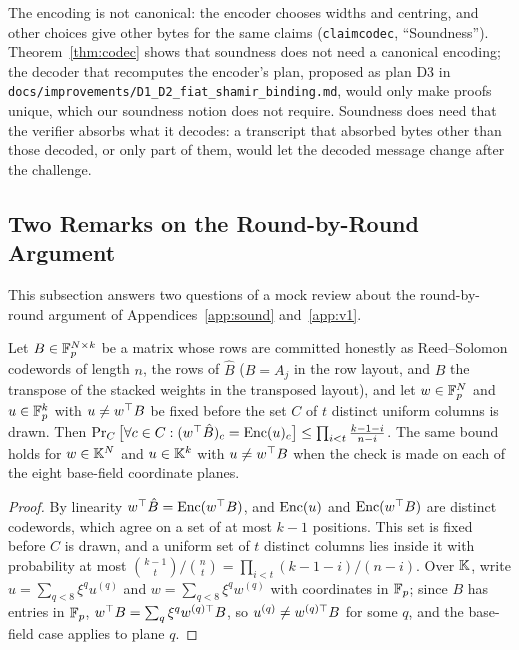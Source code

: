 \noindent The encoding is not canonical: the encoder chooses widths and centring, and other choices
give other bytes for the same claims (\texttt{claimcodec}, ``Soundness''). Theorem~\ref{thm:codec}
shows that soundness does not need a canonical encoding; the decoder that recomputes the encoder's
plan, proposed as plan D3 in \texttt{docs/improvements/D1\_D2\_fiat\_shamir\_binding.md}, would only
make proofs unique, which our soundness notion does not require. Soundness does need that the
verifier absorbs what it decodes: a transcript that absorbed bytes other than those decoded, or only
part of them, would let the decoded message change after the challenge.

\subsection{Two Remarks on the Round-by-Round Argument}
\label{app:rbr}

This subsection answers two questions of a mock review about the round-by-round argument of
Appendices~\ref{app:sound} and~\ref{app:v1}.

\begin{lemma}
\label{lem:col-any}
Let $B\in\mathbb{F}_p^{N\times k}$ be a matrix whose rows are committed honestly as Reed--Solomon codewords
of length $n$, the rows of $\hat B$ ($B=A_j$ in the row layout, and $B$ the transpose of the stacked
weights in the transposed layout), and let $w\in\mathbb{F}_p^N$ and $u\in\mathbb{F}_p^k$ with $u\neq w^\top B$ be fixed
before the set $C$ of $t$ distinct uniform columns is drawn. Then
$\Pr_C\big[\forall c\in C:(w^\top\hat B)_c=\mathrm{Enc}(u)_c\big]\le\prod_{i<t}\frac{k-1-i}{n-i}$. The same
bound holds for $w\in\mathbb{K}^N$ and $u\in\mathbb{K}^k$ with $u\neq w^\top B$ when the check is made on each
of the eight base-field coordinate planes.
\end{lemma}

\begin{proof}
By linearity $w^\top\hat B=\mathrm{Enc}(w^\top B)$, and $\mathrm{Enc}(u)$ and $\mathrm{Enc}(w^\top B)$ are distinct codewords,
which agree on a set of at most $k-1$ positions. This set is fixed before $C$ is drawn, and a
uniform set of $t$ distinct columns lies inside it with probability at most
$\binom{k-1}{t}/\binom{n}{t}=\prod_{i<t}(k-1-i)/(n-i)$. Over $\mathbb{K}$, write
$u=\sum_{q<8}\xi^qu^{(q)}$ and $w=\sum_{q<8}\xi^qw^{(q)}$ with coordinates in $\mathbb{F}_p$; since $B$ has
entries in $\mathbb{F}_p$, $w^\top B=\sum_q\xi^qw^{(q)\top}B$, so $u^{(q)}\neq w^{(q)\top}B$ for some $q$, and the
base-field case applies to plane $q$.
\end{proof}

